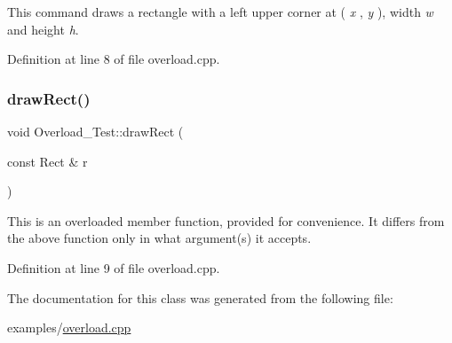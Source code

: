 This command draws a rectangle with a left upper corner at ( {\itshape x} , {\itshape y} ), width {\itshape w} and height {\itshape h}. 

Definition at line 8 of file overload.\+cpp.


\begin{DoxyCode}{0}

\end{DoxyCode}
\mbox{\label{class_overload___test_a7a613f50092cbc0ef830a818d9f3409c}} 
\subsubsection{\texorpdfstring{drawRect()}{drawRect()}\hspace{0.1cm}{\footnotesize\ttfamily [2/2]}}
{\footnotesize\ttfamily void Overload\+\_\+\+Test\+::draw\+Rect (\begin{DoxyParamCaption}\item[{const Rect \&}]{r }\end{DoxyParamCaption})}

This is an overloaded member function, provided for convenience. It differs from the above function only in what argument(s) it accepts.

Definition at line 9 of file overload.\+cpp.


\begin{DoxyCode}{0}

\end{DoxyCode}


The documentation for this class was generated from the following file\+:\begin{DoxyCompactItemize}
\item 
examples/\mbox{\hyperlink{overload_8cpp}{overload.\+cpp}}\end{DoxyCompactItemize}
